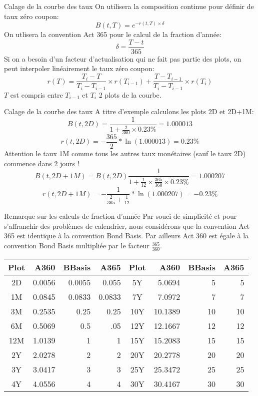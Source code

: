 \documentclass{beamer}
\begin{document}
\begin{frame}{Calage de la courbe des taux}
On utilisera la composition continue pour définir de taux zéro coupon:
\[
B(t,T)=e^{-r(t,T) \times \delta }	
\]
On utlisera la convention Act 365 pour le calcul de la fraction d'année:
\[
\delta = \frac{T-t}{365}
\]
Si on a besoin d'un facteur d'actualisation qui ne fait pas partie des plots, on peut interpoler linéairement le taux zéro coupon:
\[
r(T)=\frac{T_{i}-T}{T_{i}-T_{i-1}}\times r(T_{i-1})+\frac{T-T_{i-1}}{T_{i}-T_{i-1}} \times r(T_{i})
\]
$T$ est compris entre $T_{i-1}$ et $T_{i}$ 2 plots de la courbe.
\end{frame}
\begin{frame}{Calage de la courbe des taux}
A titre d'exemple calculons les plots 2D et 2D+1M:\\
\[
B(t,2D)=\frac{1}{1+\frac{2}{360} \times 0.23\%}=1.000013
\]
\[r(t,2D)=-\frac{365}{2}*\ln(1.000013)=0.23\%
\]
Attention le taux 1M comme tous les autres taux monétaires (sauf le taux 2D) commence dans 2 jours !
\[
B(t,2D+1M)=B(t,2D)\frac{1}{1+\frac{1}{12} \times \frac{365}{360}  \times 0.23\%}=1.000207
\]
\[r(t,2D+1M)=-\frac{1}{\frac{2}{365}+\frac{1}{12}}*\ln(1.000207)=-0.23\%
\]
\end{frame}

\begin{frame}{Remarque sur les calculs de fraction d'année}
Par souci de simplicité et pour s'affranchir des problèmes de calendrier, nous considérons que la convention Act 365 est identique à la convention Bond Basis. Par ailleurs Act 360 est égale à la convention Bond Basis multipliée par le facteur $\frac{365}{360}$.
\newline
\newline
\begin{tabular}{|c|r|r|r|c|r|r|r|}
  \hline
   Plot & A360 & BBasis & A365 & Plot & A360 & BBasis & A365 \\
  \hline
 2D & 0.0056 & 0.0055 & 0.055 & 5Y & 5.0694 & 5 & 5\\
 1M & 0.0845 & 0.0833 & 0.0833 & 7Y & 7.0972 & 7 & 7 \\
 3M & 0.2535 & 0.25 & 0.25 & 10Y & 10.1389 & 10 & 10 \\
 6M & 0.5069 & 0.5 & .05  & 12Y & 12.1667 & 12 & 12 \\
 12M & 1.0139 & 1 & 1 & 15Y & 15.2083 & 15 & 15 \\
 2Y & 2.0278 & 2 & 2 & 20Y & 20.2778 & 20 & 20 \\
 3Y & 3.0417 & 3 & 3 & 25Y & 25.3472 & 25 & 25 \\
 4Y & 4.0556 & 4 & 4 & 30Y & 30.4167 & 30 & 30 \\
  \hline
\end{tabular}

\end{frame}
\end{document}
